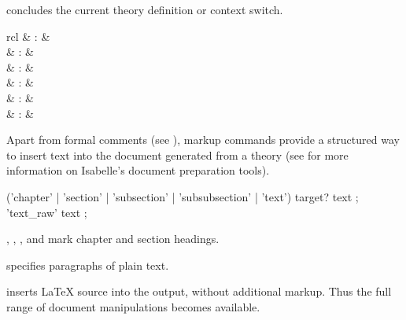 \begin{isabellebody}
\begin{isamarkuptext}
\begin{descr}
  \item [\isa{\isacommand{end}}] concludes the current theory definition or
  context switch.

  \end{descr}%
\end{isamarkuptext}%
\isamarkuptrue%
%
\isamarkuptrue%
%
\begin{isamarkuptext}%
\begin{matharray}{rcl}
     & : &  \\
     & : &  \\
     & : &  \\
     & : &  \\
     & : &  \\
     & : &  \\
  \end{matharray}

  Apart from formal comments (see ), markup
  commands provide a structured way to insert text into the document
  generated from a theory (see \cite{isabelle-sys} for more
  information on Isabelle's document preparation tools).

  \begin{rail}
    ('chapter' | 'section' | 'subsection' | 'subsubsection' | 'text') target? text
    ;
    'text\_raw' text
    ;
  \end{rail}

  \begin{descr}

  \item [\isa{\isacommand{chapter}}, \isa{\isacommand{section}}, \isa{\isacommand{subsection}}, and \isa{\isacommand{subsubsection}}] mark chapter and
  section headings.

  \item [\isa{\isacommand{text}}] specifies paragraphs of plain text.

  \item [\isa{\isacommand{text{\isacharunderscore}raw}}] inserts {\LaTeX} source into the
  output, without additional markup.  Thus the full range of document
  manipulations becomes available.


\end{descr}
\end{isamarkuptext}
\end{isabellebody}
